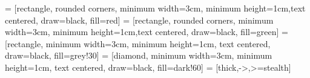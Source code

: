 
 = [rectangle, rounded corners, minimum width=3cm, minimum height=1cm,text centered, draw=black, fill=red]
 = [rectangle, rounded corners, minimum width=3cm, minimum height=1cm,text centered, draw=black, fill=green]
 = [rectangle, minimum width=3cm, minimum height=1cm, text centered, draw=black, fill=grey!30]
 = [diamond, minimum width=3cm, minimum height=1cm, text centered, draw=black, fill=dark!60]
 = [thick,->,>=stealth]
